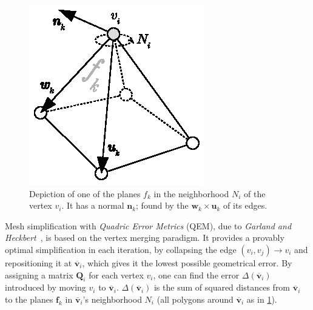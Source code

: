 \begin{figure}[ht]
\begin{minipage}{0.485\textwidth}
        \includegraphics[width=\textwidth]{figures/quadric_planes.eps}
        \caption{Depiction of one of the planes \(f_k\) in the neighborhood \(N_i\) of the vertex \(v_i\). It has a normal \(\mathbf{n}_k\); found by the \(\mathbf{w}_k \times \mathbf{u}_k\) of its edges.}
        \label{fig:quadrics}
    \end{minipage}
\end{figure}
\fi %

Mesh simplification with \emph{Quadric Error Metrics} (QEM), due to \emph{Garland and Heckbert}~\cite{garland1997surface}, is based on the vertex merging paradigm. It provides a provably optimal simplification in each iteration, by collapsing the edge \((v_i, v_j) \rightarrow v_i\) and repositioning it at \(\mathbf{\overline{v}}_i\), which gives it the lowest possible geometrical error. By assigning a matrix \(\mathbf{Q}_i\) for each vertex \(v_i\), one can find the error \(\Delta(\mathbf{\overline{v}}_i)\) introduced by moving \(v_i\) to \(\mathbf{\overline{v}}_i\). \(\Delta(\mathbf{\overline{v}}_i)\) is the sum of squared distances from \(\mathbf{\overline{v}}_i\) to the planes \(\mathbf{f}_k\) in \(\mathbf{\overline{v}}_i\)'s neighborhood \(N_i\) (all polygons around \(\mathbf{\overline{v}}_i\) as in \cref{fig:quadrics}).

